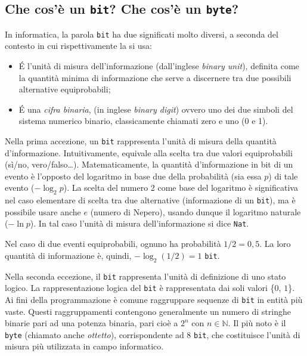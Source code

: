 	\subsection{Che cos'è un \lstinline!bit!? Che cos'è un \lstinline!byte!?}
	\label{susec:bit}

In informatica, la parola \lstinline!bit! ha due significati molto diversi, a seconda del contesto in cui rispettivamente la si usa:
\begin{itemize}
	\item
\'E l'unità di misura dell'informazione (dall'inglese \emph{binary unit}), definita come la quantità minima di informazione che serve a discernere tra due possibili alternative equiprobabili;
	\item
\'E una \emph{cifra binaria}, (in inglese \emph{binary digit}) ovvero uno dei due simboli del sistema numerico binario, classicamente chiamati zero e uno (0 e 1).
\end{itemize}

Nella  prima accezione, un \lstinline!bit! rappresenta l'unità di misura della quantità d'informazione. Intuitivamente, equivale alla scelta tra due valori equiprobabili (sì/no, vero/falso\dots). Matematicamente, la quantità d'informazione in bit di un evento è l'opposto del logaritmo in base due della probabilità (sia essa $p$) di tale evento ($-\log_2 p$). La scelta del numero 2 come base del logaritmo è significativa nel caso elementare di scelta tra due alternative (informazione di un \lstinline!bit!), ma è possibile usare anche $e$ (numero di Nepero), usando dunque il logaritmo naturale ($-\ln p$). In tal caso l'unità di misura dell'informazione si dice \lstinline!Nat!.

Nel caso di due eventi equiprobabili, ognuno ha probabilità $1/2=0,5$. La loro quantità di informazione è, quindi, $-\log_2(1/2) = 1$ \lstinline!bit!.

Nella  seconda eccezione, il \lstinline!bit! rappresenta l'unità di definizione di uno stato logico. La rappresentazione logica del \lstinline!bit! è rappresentata dai soli valori \{$0$, $1$\}. Ai fini della programmazione è comune raggruppare sequenze di \lstinline!bit! in entità più vaste. Questi raggruppamenti contengono generalmente un numero di stringhe binarie pari ad una potenza binaria, pari cioè a $2^n$ con $n \in \mathbb{N} $. Il  più noto è il \lstinline!byte! (chiamato anche \emph{ottetto}), corrispondente ad 8 \lstinline!bit!, che costituisce l'unità di misura più utilizzata in campo informatico.

